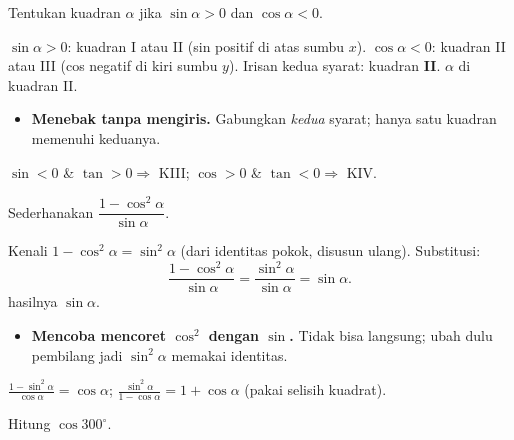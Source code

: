 \begin{soalbox}{}
Tentukan kuadran $\alpha$ jika $\sin\alpha>0$ dan $\cos\alpha<0$.
\end{soalbox}

\jawab
{} $\sin\alpha>0$: kuadran I atau II (sin positif di atas sumbu $x$).
 $\cos\alpha<0$: kuadran II atau III (cos negatif di kiri sumbu $y$).
 Irisan kedua syarat: kuadran \textbf{II}.
\jadi $\alpha$ di kuadran II.

\begin{jebakan}
\begin{itemize}[leftmargin=*,topsep=2pt]
  \item \textbf{Menebak tanpa mengiris.} Gabungkan \emph{kedua} syarat; hanya
  satu kuadran memenuhi keduanya.
\end{itemize}
\end{jebakan}

\begin{variasi}
$\sin<0$ \& $\tan>0\Rightarrow$ KIII; $\cos>0$ \& $\tan<0\Rightarrow$ KIV.
\end{variasi}

\begin{soalbox}{}
Sederhanakan $\dfrac{1-\cos^2\alpha}{\sin\alpha}$.
\end{soalbox}

\jawab
{} Kenali $1-\cos^2\alpha=\sin^2\alpha$ (dari identitas pokok, disusun
ulang).
 Substitusi:
\[
\frac{1-\cos^2\alpha}{\sin\alpha}=\frac{\sin^2\alpha}{\sin\alpha}=\sin\alpha.
\]
\jadi hasilnya $\sin\alpha$.

\begin{jebakan}
\begin{itemize}[leftmargin=*,topsep=2pt]
  \item \textbf{Mencoba mencoret $\cos^2$ dengan $\sin$.} Tidak bisa langsung;
  ubah dulu pembilang jadi $\sin^2\alpha$ memakai identitas.
\end{itemize}
\end{jebakan}

\begin{variasi}
$\frac{1-\sin^2\alpha}{\cos\alpha}=\cos\alpha$;
$\frac{\sin^2\alpha}{1-\cos\alpha}=1+\cos\alpha$ (pakai selisih kuadrat).
\end{variasi}

\begin{soalbox}{}
Hitung $\cos300^\circ$.
\end{soalbox}

